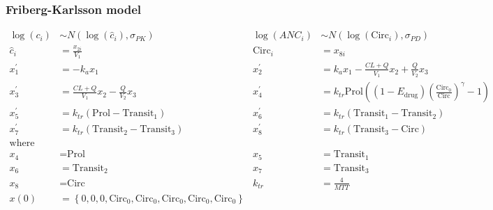 \documentclass{beamer}
\begin{document}
\begin{frame}
\frametitle{Friberg-Karlsson model}

\vspace{-24pt}
  \begin{scriptsize}
    \begin{align*}
     \log\left(c_i\right) &\sim
                                N\left(\log\left(\hat{c}_i\right),\sigma_{PK}\right)
                                &  \log\left(ANC_i\right) &\sim
                                                                   N\left(\log\left(\text{Circ}_i\right),\sigma_{PD}\right) \\
      \hat{c}_i &= \frac{x_{2i}}{V_{1}} 
      & \text{Circ}_{i} &= x_{8i} \\
x_1^\prime &= -k_a x_1 &
x_2^\prime &= k_a x_1 - \frac{CL + Q}{V_1} x_2 + \frac{Q}{V_2}
             x_3 \\
x_3^\prime &= \frac{CL + Q}{V_1} x_2 - \frac{Q}{V_2}  x_3 &
x_4^\prime &= k_{tr} \text{Prol} \left((1 - E_\text{drug})
             \left(\frac{\text{Circ}_0}{\text{Circ}}\right)^\gamma -
             1\right) \\ 
x_5^\prime &= k_{tr} (\text{Prol} - \text{Transit}_1) &
x_6^\prime &= k_{tr} (\text{Transit}_1 - \text{Transit}_2) \\
x_7^\prime &= k_{tr} (\text{Transit}_2 - \text{Transit}_3) &
x_8^\prime &= k_{tr} (\text{Transit}_3 - \text{Circ}) \\
\text{where} \\
x_4 &= \text{Prol}  &
x_5 &= \text{Transit}_1 \\
x_6 &= \text{Transit}_2 &
 x_7 &= \text{Transit}_3 \\
x_8 &= \text{Circ} &
k_{tr} &= \frac{4}{MTT} \\
x\left(0\right) &= \left\{0, 0, 0, \text{Circ}_0, \text{Circ}_0,
                  \text{Circ}_0, \text{Circ}_0, \text{Circ}_0\right\}
    \end{align*}
  \end{scriptsize}

\end{frame}
\end{document}
